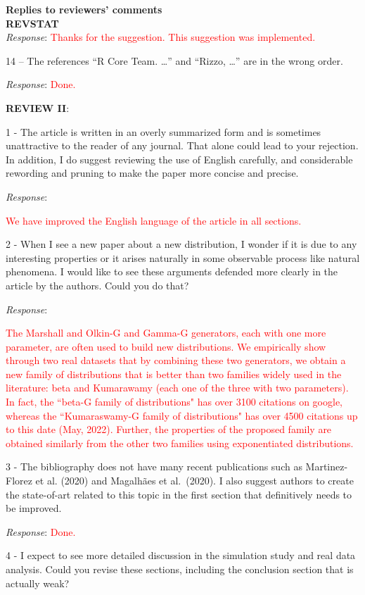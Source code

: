 \documentclass[version=last,12pt,{"maintainersDelight"}]{scrlttr2}
\begin{document}
\begin{letter}{\textbf{Replies to reviewers' comments}\\\textbf{REVSTAT}\\}
\emph{Response}:
\textcolor{red}{Thanks for the suggestion. This suggestion was implemented.}

14 -- The references ``R Core Team. \ldots{}'' and ``Rizzo, \ldots{}'' are in the wrong order.

\emph{Response}: \textcolor{red}{Done.}

\textbf{REVIEW II}:

1 - The article is written in an overly summarized form and is sometimes unattractive to the reader of any journal. That alone could lead to your rejection. In addition, I do suggest reviewing the use of English carefully, and considerable rewording and pruning to make the paper more concise and precise.

\emph{Response}:

\textcolor{red}{We have improved the English language of the article in all sections.}

2 - When I see a new paper about a new distribution, I wonder if it is due to any interesting properties or it arises naturally in some
observable process like natural phenomena. I would like to see these
arguments defended more clearly in the article by the authors. Could you do that?



\emph{Response}:

\textcolor{red}{The Marshall and Olkin-G and Gamma-G generators, each with one more parameter, are often used to build new distributions. We empirically show through two real datasets that by combining these two generators, we obtain a new family of distributions that is better than two families widely used in the literature: beta and Kumarawamy (each one of the three with two parameters). In fact, the ``beta-G family of distributions" has over 3100 citations on google, whereas the ``Kumaraswamy-G family of distributions" has over 4500 citations  up to this date (May, 2022). Further, the properties of the proposed family are obtained similarly from the other two families using exponentiated distributions.} 

3 - The bibliography does not have many recent publications such as
Martinez-Florez et al. (2020) and Magalhães et al.~(2020). I also
suggest authors to create the state-of-art related to this topic in the first section that definitively needs to be improved.

\emph{Response}: \textcolor{red}{Done.}

4 - I expect to see more detailed discussion in the simulation study and real data analysis. Could you revise these sections, including the conclusion section that is actually weak?


\end{letter}
\end{document}

